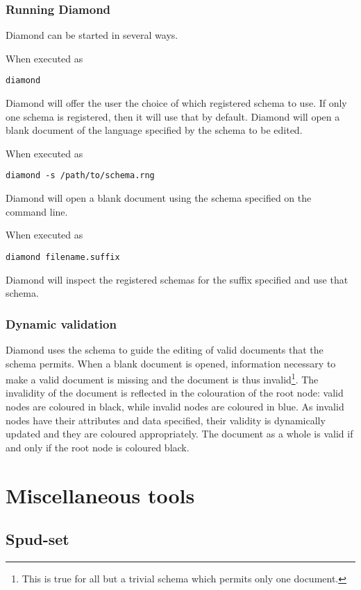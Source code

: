 \documentclass[a4paper, 11pt]{book}
\begin{document}
\subsection{Running Diamond}

Diamond can be started in several ways.

When executed as
\begin{verbatim}
diamond
\end{verbatim}
Diamond will offer the user the choice of which registered schema to use.
If only one schema is registered, then it will use that by default.
Diamond will open a blank document of the language specified by the schema to be edited.

When executed as
\begin{verbatim}
diamond -s /path/to/schema.rng
\end{verbatim}
Diamond will open a blank document using the schema specified on the command line.

When executed as
\begin{verbatim}
diamond filename.suffix
\end{verbatim}
Diamond will inspect the registered schemas for the suffix specified
and use that schema.

\subsection{Dynamic validation}
Diamond uses the schema to guide the editing of valid documents that the schema
permits. When a blank document is opened, information necessary to make a valid
document is missing and the document is thus invalid\footnote{This is true for all
but a trivial schema which permits only one document.}. The invalidity of the document
is reflected in the colouration of the root node: valid nodes are coloured in black,
while invalid nodes are coloured in blue. As invalid nodes have their attributes
and data specified, their validity is dynamically updated and they are coloured appropriately.
The document as a whole is valid if and only if the root node is coloured black.

\chapter{Miscellaneous tools}

\section{Spud-set}
\end{document}
